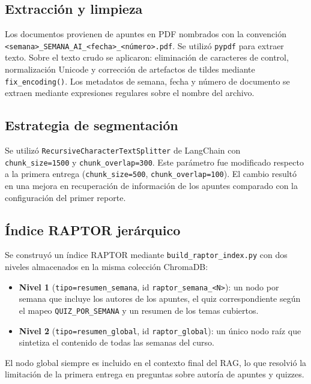 \documentclass[conference]{IEEEtran}
\begin{document}
\subsection{Extracción y limpieza}

Los documentos provienen de apuntes en PDF nombrados con la convención \texttt{<semana>\_SEMANA\_AI\_<fecha>\_<número>.pdf}. Se utilizó \texttt{pypdf} para extraer texto. Sobre el texto crudo se aplicaron: eliminación de caracteres de control, normalización Unicode y corrección de artefactos de tildes mediante \texttt{fix\_encoding()}. Los metadatos de semana, fecha y número de documento se extraen mediante expresiones regulares sobre el nombre del archivo.

\subsection{Estrategia de segmentación}

Se utilizó \texttt{RecursiveCharacterTextSplitter} de LangChain con \texttt{chunk\_size=1500} y \texttt{chunk\_overlap=300}. Este parámetro fue modificado respecto a la primera entrega (\texttt{chunk\_size=500}, \texttt{chunk\_overlap=100}). El cambio resultó en una mejora en recuperación de información de los apuntes comparado con la configuración del primer reporte.

\subsection{Índice RAPTOR jerárquico}

Se construyó un índice RAPTOR mediante \texttt{build\_raptor\_index.py} con dos niveles almacenados en la misma colección ChromaDB:

\begin{itemize}
    \item \textbf{Nivel 1} (\texttt{tipo=resumen\_semana}, id \texttt{raptor\_semana\_<N>}): un nodo por semana que incluye los autores de los apuntes, el quiz correspondiente según el mapeo \texttt{QUIZ\_POR\_SEMANA} y un resumen de los temas cubiertos.
    \item \textbf{Nivel 2} (\texttt{tipo=resumen\_global}, id \texttt{raptor\_global}): un único nodo raíz que sintetiza el contenido de todas las semanas del curso.
\end{itemize}

El nodo global siempre es incluido en el contexto final del RAG, lo que resolvió la limitación de la primera entrega en preguntas sobre autoría de apuntes y quizzes.
\end{document}
